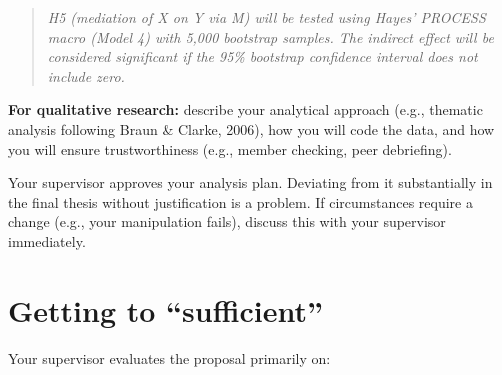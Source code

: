 \documentclass[
  11pt,
  a4paper,
]{scrbook}
\begin{document}
\begin{quote}
\emph{H5 (mediation of X on Y via M) will be tested using Hayes' PROCESS
macro (Model 4) with 5,000 bootstrap samples. The indirect effect will
be considered significant if the 95\% bootstrap confidence interval does
not include zero.}
\end{quote}

\textbf{For qualitative research:} describe your analytical approach
(e.g., thematic analysis following Braun \& Clarke, 2006), how you will
code the data, and how you will ensure trustworthiness (e.g., member
checking, peer debriefing).

\begin{tcolorbox}[enhanced jigsaw, bottomrule=.15mm, opacityback=0, toprule=.15mm, colframe=quarto-callout-important-color-frame, left=2mm, rightrule=.15mm, title=\textcolor{quarto-callout-important-color}{\faExclamation}\hspace{0.5em}{The analysis plan is binding}, colbacktitle=quarto-callout-important-color!10!white, bottomtitle=1mm, colback=white, breakable, toptitle=1mm, titlerule=0mm, leftrule=.75mm, arc=.35mm, opacitybacktitle=0.6, coltitle=black]

Your supervisor approves your analysis plan. Deviating from it
substantially in the final thesis without justification is a problem. If
circumstances require a change (e.g., your manipulation fails), discuss
this with your supervisor immediately.

\end{tcolorbox}

\section{Getting to ``sufficient''}\label{getting-to-sufficient}

Your supervisor evaluates the proposal primarily on:
\end{document}

